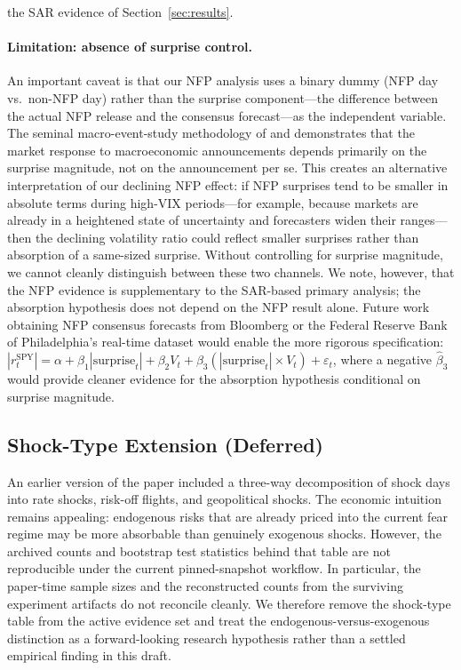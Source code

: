 \documentclass[12pt,a4paper]{article}
\begin{document}
the SAR evidence of Section~\ref{sec:results}.

\paragraph{Limitation: absence of surprise control.} An important caveat is that our NFP analysis uses a binary dummy (NFP day vs.\ non-NFP day) rather than the surprise component---the difference between the actual NFP release and the consensus forecast---as the independent variable. The seminal macro-event-study methodology of \citet{andersen2003} and \citet{balduzzi2001} demonstrates that the market response to macroeconomic announcements depends primarily on the surprise magnitude, not on the announcement per se. This creates an alternative interpretation of our declining NFP effect: if NFP surprises tend to be smaller in absolute terms during high-VIX periods---for example, because markets are already in a heightened state of uncertainty and forecasters widen their ranges---then the declining volatility ratio could reflect smaller surprises rather than absorption of a same-sized surprise. Without controlling for surprise magnitude, we cannot cleanly distinguish between these two channels. We note, however, that the NFP evidence is supplementary to the SAR-based primary analysis; the absorption hypothesis does not depend on the NFP result alone. Future work obtaining NFP consensus forecasts from Bloomberg or the Federal Reserve Bank of Philadelphia's real-time dataset would enable the more rigorous specification: $|r_t^{\text{SPY}}| = \alpha + \beta_1 |\text{surprise}_t| + \beta_2 V_t + \beta_3 (|\text{surprise}_t| \times V_t) + \varepsilon_t$, where a negative $\hat{\beta}_3$ would provide cleaner evidence for the absorption hypothesis conditional on surprise magnitude.

\subsection{Shock-Type Extension (Deferred)}
\label{sec:endo_exo}

An earlier version of the paper included a three-way decomposition of shock days into rate shocks, risk-off flights, and geopolitical shocks. The economic intuition remains appealing: endogenous risks that are already priced into the current fear regime may be more absorbable than genuinely exogenous shocks. However, the archived counts and bootstrap test statistics behind that table are not reproducible under the current pinned-snapshot workflow. In particular, the paper-time sample sizes and the reconstructed counts from the surviving experiment artifacts do not reconcile cleanly. We therefore remove the shock-type table from the active evidence set and treat the endogenous-versus-exogenous distinction as a forward-looking research hypothesis rather than a settled empirical finding in this draft.
\end{document}
